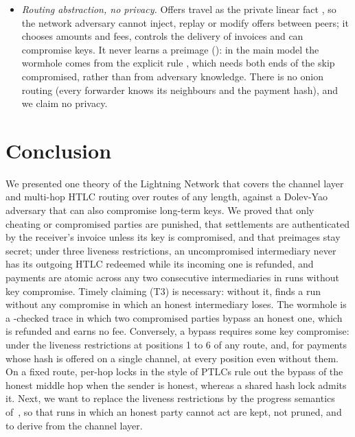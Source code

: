 \begin{itemize}[\setlength{\IEEElabelindent}{0pt}]
  ), but settling or refunding an HTLC does not update the channel
  state. That each HTLC is resolved at most once is assumed as the restriction , not
  derived from the channel layer; we do not claim a composition theorem. A channel carries at
  most one pending HTLC at a time ().
\item \emph{Routing abstraction, no privacy.} Offers travel as the private linear fact
  , so the network adversary cannot inject, replay or modify offers between peers; it
  chooses amounts and fees, controls the delivery of invoices and can compromise keys. It never
  learns a preimage (): in the main model the wormhole comes from the
  explicit rule , which needs both ends of the skip compromised, rather than
  from adversary knowledge. There is no onion
  routing (every forwarder knows its neighbours and the payment hash), and we claim no privacy.
\end{itemize}

\section{Conclusion}\label{sec:conclusion}

We presented one \tamarin{} theory of the Lightning Network that covers the channel layer and
multi-hop HTLC routing over routes of any length, against a Dolev-Yao adversary that can also
compromise long-term keys. We proved that only cheating or compromised parties are punished,
that settlements are authenticated by the receiver's invoice unless its key is compromised, and
that preimages stay secret;
under three liveness restrictions, an uncompromised intermediary never has its outgoing HTLC
redeemed while its incoming one is refunded, and payments are atomic across any two consecutive
intermediaries in runs without key compromise. Timely claiming (T3) is necessary: without it, \tamarin{}
finds a run without any compromise in which an honest intermediary loses. The wormhole is a
\tamarin-checked trace in which two compromised parties bypass an honest one, which is refunded
and earns no fee. Conversely, a bypass requires some key compromise: under the liveness
restrictions at positions 1 to 6 of any route, and, for payments whose hash is offered on a
single channel, at every position even without them. On a fixed route, per-hop locks in the
style of PTLCs rule out the bypass of the honest middle hop when the sender is honest, whereas a shared
hash lock admits it. Next, we want to replace the liveness restrictions by the progress
semantics of~\cite{backes2017}, so that runs in which an honest party cannot act are kept, not
pruned, and to derive  from the channel layer.

